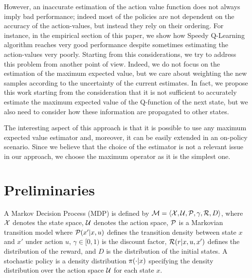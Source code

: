 \documentclass[conference]{IEEEtran}
\begin{document}
However, an inaccurate estimation of the action value function does not always imply bad performance; indeed most of the policies are not dependent on the accuracy of the action-values, but instead they rely on their ordering. For instance, in the empirical section of this paper, we show how Speedy Q-Learning algorithm \cite{NIPS2011_4251} reaches very good performance despite sometimes estimating the action-values very poorly. Starting from this considerations, we try to address this problem from another point of view. Indeed, we do not focus on the estimation of the maximum expected value, but we care about weighting the new samples according to the uncertainty of the current estimates.
In fact, we propose this work starting from the consideration that it is not sufficient to accurately estimate the maximum expected value of the Q-function of the next state, but we also need to consider how these information are propagated to other states.

The interesting aspect of this approach is that it is possible to use any maximum expected value estimator and, moreover, it can be easily extended in an on-policy scenario. Since we believe that the choice of the estimator is not a relevant issue in our approach, we choose the maximum operator as it is the simplest one.

\section{Preliminaries}
A Markov Decision Process (MDP) is defined by $\mathcal{M} = \langle \mathcal X,\mathcal U,\mathcal{P},\gamma,\mathcal{R}, D\rangle$, where $\mathcal X$ denotes the state space, $\mathcal U$ denotes the action space, $\mathcal{P}$ is a Markovian transition model where $\mathcal{P}(x'|x,u)$ defines the transition density between state $x$ and $x'$ under action $u$, $\gamma\in[0,1)$ is the discount factor, $\mathcal{R}(r|x, u, x')$ defines the distribution of the reward, and $D$ is the distribution of the initial states.
A stochastic policy is a density distribution $\pi(\cdot|x)$ specifying the density distribution over the action space $\mathcal U$ for each state $x$.
\end{document}
